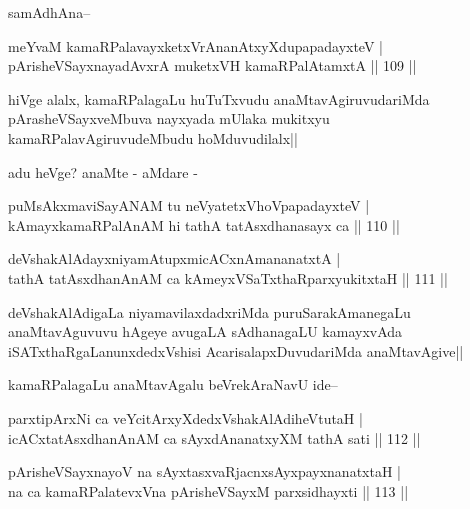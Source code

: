 \begin{artha}
samAdhAna--
\end{artha}

\begin{shl}
meYvaM kamaRPalavayxketxVrAnanAtxyXdupapadayxteV |\\
pArisheVSayxnayadAvxrA muketxVH kamaRPalAtamxtA \hfill || 109 ||
\end{shl}

\begin{artha}
hiVge alalx, kamaRPalagaLu huTuTxvudu anaMtavAgiruvudariMda pArasheVSayxveMbuva nayxyada mUlaka mukitxyu kamaRPalavAgiruvudeMbudu hoMduvudilalx||
\end{artha}

\begin{artha}
adu heVge? anaMte - aMdare -
\end{artha}

\begin{shl}
puMsAkxmaviSayANAM tu neVyatetxVhoVpapadayxteV |\\
kAmayxkamaRPalAnAM hi tathA tatAsxdhanasayx ca \hfill || 110 ||
\end{shl}

\begin{shl}
deVshakAlAdayxniyamAtupxmicACxnAmananatxtA |\\
tathA tatAsxdhanAnAM ca kAmeyxVSaTxthaRparxyukitxtaH \hfill || 111 ||
\end{shl}

\begin{artha}
deVshakAlAdigaLa niyamavilaxdadxriMda puruSarakAmanegaLu anaMtavAguvuvu hAgeye avugaLA sAdhanagaLU kamayxvAda iSATxthaRgaLanunxdedxVshisi AcarisalapxDuvudariMda anaMtavAgive||
\end{artha}

\begin{artha}
kamaRPalagaLu anaMtavAgalu beVrekAraNavU ide--
\end{artha}

\begin{shl}
parxtipArxNi ca veYcitArxyXdedxVshakAlAdiheVtutaH |\\
icACxtatAsxdhanAnAM ca sAyxdAnanatxyXM tathA sati \hfill || 112 ||
\end{shl}

\begin{shl}
pArisheVSayxnayoV na sAyxtasxvaRjacnxsAyxpayxnanatxtaH |\\
na ca kamaRPalatevxVna pArisheVSayxM parxsidhayxti \hfill || 113 ||
\end{shl}

